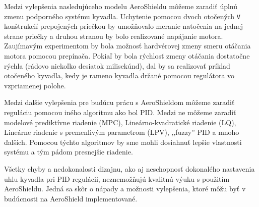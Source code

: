 Medzi vylepšenia nasledujúceho modelu AeroShieldu môžeme zaradiť úplnú zmenu podporného systému kyvadla. Uchytenie pomocou dvoch otočených \verb|V| konštrukcií prepojených priečkou by umožňovalo meranie natočenia na jednej strane priečky a druhou stranou by bolo realizované napájanie motora. Zaujímavým experimentom by bola možnosť hardvérovej zmeny smeru otáčania motora pomocou prepínača. Pokiaľ by bola rýchlosť zmeny otáčania dostatočne rýchla (rádovo niekoľko desiatok milisekúnd), dal by sa realizovať príklad otočeného kyvadla, kedy je rameno kyvadla držané pomocou regulátora vo vzpriamenej polohe.   

Medzi dalšie vylepšenia pre budúcu prácu s AeroShieldom môžeme zaradiť reguláciu pomocou iného algoritmu ako bol PID. Medzi ne môžeme zaradiť modelové prediktívne riadenie (MPC), Lineárno-kvadratické riadenie (LQ), Lineárne riadenie s premenlivým parametrom (LPV), ,,fuzzy'' PID a mnoho ďalších. Pomocou týchto algoritmov by sme mohli dosiahnuť lepšie vlastnosti systému a tým pádom presnejšie riadenie. 

Všetky chyby a nedokonalosti dizajnu, ako aj neschopnosť dokonalého nastavenia uhlu kyvadla pri PID regulácii,
neznemožňujú kvalitnú výuku s použitím AeroShieldu. Jedná sa skôr o nápady a možnosti vylepšenia, ktoré môžu byť v budúcnosti na AeroShield implementované.
